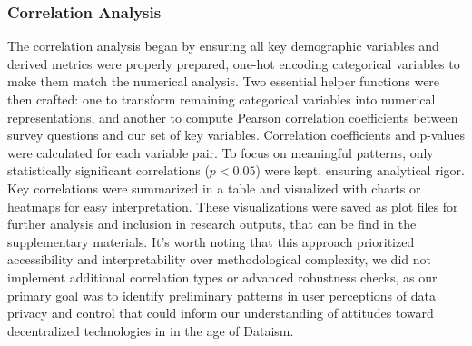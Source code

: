 	\subsubsection{Correlation Analysis}
	The correlation analysis began by ensuring all key demographic variables and derived metrics were properly prepared, one-hot encoding categorical variables to make them match the numerical analysis. Two essential helper functions were then crafted: one to transform remaining categorical variables into numerical representations, and another to compute Pearson correlation coefficients between survey questions and our set of key variables. Correlation coefficients and p-values were calculated for each variable pair. To focus on meaningful patterns, only statistically significant correlations ($p < 0.05$) were kept, ensuring analytical rigor. Key correlations were summarized in a table and visualized with charts or heatmaps for easy interpretation. These visualizations were saved as plot files for further analysis and inclusion in research outputs, that can be find in the supplementary materials. It's worth noting that this approach prioritized accessibility and interpretability over methodological complexity, we did not implement additional correlation types or advanced robustness checks, as our primary goal was to identify preliminary patterns in user perceptions of data privacy and control that could inform our understanding of attitudes toward decentralized technologies in in the age of Dataism.
